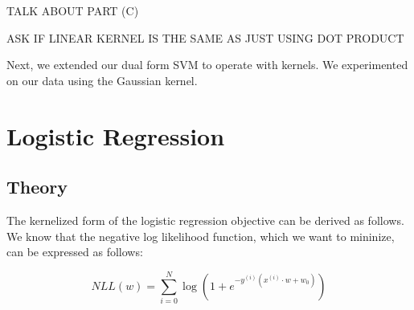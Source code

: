 \documentclass{sigchi}
\begin{document}
TALK ABOUT PART (C)

ASK IF LINEAR KERNEL IS THE SAME AS JUST USING DOT PRODUCT

Next, we extended our dual form SVM to operate with kernels. We experimented on our data using the Gaussian kernel. 

\section{Logistic Regression}

\subsection{Theory}

The kernelized form of the logistic regression objective can be derived as follows. We know that the negative log likelihood function, which we want to mininize, can be expressed as follows:

$$NLL(w) = \sum_{i=0}^N \log(1+e^{-y^{(i)}(x^{(i)}\cdot w + w_0)}) $$
\end{document}

